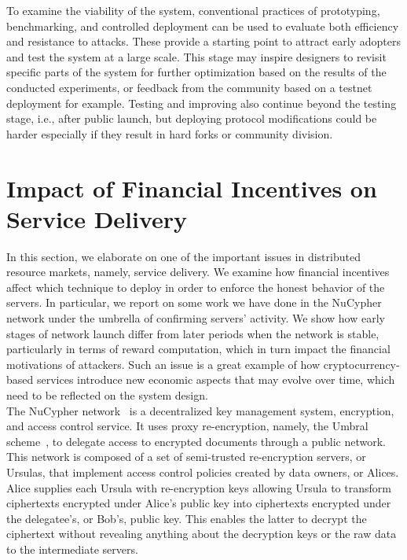 \documentclass{llncs}
\begin{document}
 To examine the viability of the system, conventional practices of prototyping, benchmarking, and controlled deployment can be used to evaluate both efficiency and resistance to attacks. These provide a starting point to attract early adopters and test the system at a large scale. This stage may inspire designers to revisit specific parts of the system for further optimization based on the results of the conducted experiments, or feedback from the community based on a testnet deployment for example. Testing and improving also continue beyond the testing stage, i.e., after public launch, but deploying protocol modifications could be harder especially if they result in hard forks or community division.


\section{Impact of Financial Incentives on Service Delivery}
\vspace{-4pt}
In this section, we elaborate on one of the important issues in distributed resource markets, namely, service delivery. We examine how financial incentives affect which technique to deploy in order to enforce the honest behavior of the servers. In particular, we report on some work we have done in the NuCypher network under the umbrella of confirming servers' activity. We show how early stages of network launch differ from later periods when the network is stable, particularly in terms of reward computation, which in turn impact the financial motivations of attackers. Such an issue is a great example of how cryptocurrency-based services introduce new economic aspects that may evolve over time, which need to be reflected on the system design. \\

  
 The NuCypher network~\cite{nucypher,egorov2017nucypher} is a decentralized key management 
system, encryption, and access control service. It uses proxy re-encryption, namely, the 
Umbral scheme~\cite{umbral2018}, to delegate access to encrypted 
documents through a public network. This network is composed of a set of semi-trusted 
re-encryption servers, or Ursulas, that implement access control policies created by data 
owners, or Alices. Alice supplies each Ursula with re-encryption keys allowing Ursula to transform 
ciphertexts encrypted under Alice's public key into ciphertexts encrypted under the delegatee's, or Bob's,
public key. This enables the latter to decrypt the ciphertext without revealing anything about the
decryption keys or the raw data to the intermediate servers. 
\end{document}
